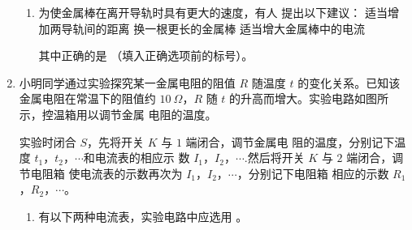 \begin{enumerate}
\begin{enumerate}
\item 
为使金属棒在离开导轨时具有更大的速度，有人
提出以下建议：
\threechoices
{适当增加两导轨间的距离}
{换一根更长的金属棒}
{适当增大金属棒中的电流}

其中正确的是 \underlinegap （填入正确选项前的标号）。





\end{enumerate}



\item 
{}
小明同学通过实验探究某一金属电阻的阻值 $ R $ 随温度 $ t $ 的变化关系。已知该
金属电阻在常温下的阻值约 $ 10 \ \Omega $，$ R $ 随 $ t $ 的升高而增大。实验电路如图所示，控温箱用以调节金属
电阻的温度。
\begin{figure}[h!]
\centering

\end{figure}



实验时闭合 $ S $，先将开关 $ K $ 与 $ 1 $ 端闭合，调节金属电
阻的温度，分别记下温度 $ t_{1} $，$ t_{2} $，$ \cdots $和电流表的相应示
数 $ I_{1} $，$ I_{2} $，$ \cdots $.然后将开关 $ K $ 与 $ 2 $ 端闭合，调节电阻箱
使电流表的示数再次为 $ I_{1} $，$ I_{2} $，$ \cdots $，分别记下电阻箱
相应的示数 $ R_{1} $，$ R_{2} $，$ \cdots $。

\begin{enumerate}
\item
有以下两种电流表，实验电路中应选用 \underlinegap 。



\end{enumerate}
\end{enumerate}
